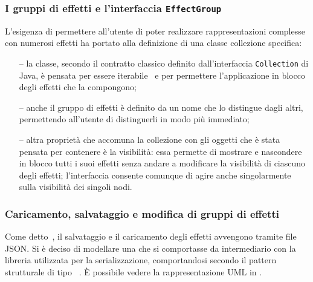             \subsubsection{I gruppi di effetti e l'interfaccia \texttt{EffectGroup}}\label{subsubsec:effectGroup}
                L'esigenza di permettere all'utente di poter realizzare rappresentazioni complesse con numerosi effetti ha portato alla definizione di una classe collezione specifica:
                \begin{itemize}
                    \item[--]\label{itm:eFXgIterator}
                        la classe, secondo il contratto classico definito dall'interfaccia \texttt{Collection} di Java, è pensata per essere iterabile~\cite{iterator} e per permettere l'applicazione in blocco degli effetti che la compongono;

                    \item[--]\label{itm:eFXgName}
                        anche il gruppo di effetti è definito da un nome che lo distingue dagli altri, permettendo all'utente di distinguerli in modo più immediato;

                    \item[--]\label{itm:eFXgVis}
                        altra proprietà che accomuna la collezione con gli oggetti che è stata pensata per contenere è la visibilità:
                        essa permette di mostrare e nascondere in blocco tutti i suoi effetti senza andare a modificare la visibilità di ciascuno degli effetti;
                        l'interfaccia consente comunque di agire anche singolarmente sulla visibilità dei singoli nodi.
                \end{itemize}

            \subsubsection{Caricamento, salvataggio e modifica di gruppi di effetti}\label{subsubsec:serializzazione}
                Come detto~, il salvataggio e il caricamento degli effetti avvengono tramite file JSON.
                Si è deciso di modellare una  che si comportasse da intermediario con la libreria utilizzata per la serializzazione, comportandosi secondo il pattern strutturale di tipo ~\cite{designPattern}.
                È possibile vedere la rappresentazione UML in .

